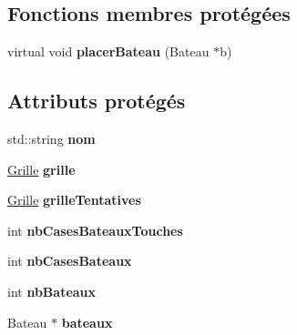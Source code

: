 \subsection*{Fonctions membres protégées}
\begin{DoxyCompactItemize}
\item 
virtual void {\bfseries placer\+Bateau} (Bateau $\ast$b)\hypertarget{class_joueur_a82aa78e161543bbbc01f759d71e0bbc7}{}\label{class_joueur_a82aa78e161543bbbc01f759d71e0bbc7}

\end{DoxyCompactItemize}
\subsection*{Attributs protégés}
\begin{DoxyCompactItemize}
\item 
std\+::string {\bfseries nom}\hypertarget{class_joueur_abaee0b4f259181bf66dbab54bef971bb}{}\label{class_joueur_abaee0b4f259181bf66dbab54bef971bb}

\item 
\hyperlink{class_grille}{Grille} {\bfseries grille}\hypertarget{class_joueur_a97a052f0b9966c94c49862df3144a62f}{}\label{class_joueur_a97a052f0b9966c94c49862df3144a62f}

\item 
\hyperlink{class_grille}{Grille} {\bfseries grille\+Tentatives}\hypertarget{class_joueur_abbef5ee9c9c05a24ffa2c462e14cdfd7}{}\label{class_joueur_abbef5ee9c9c05a24ffa2c462e14cdfd7}

\item 
int {\bfseries nb\+Cases\+Bateaux\+Touches}\hypertarget{class_joueur_a3a41069191547937ddd3acd15eecd4ee}{}\label{class_joueur_a3a41069191547937ddd3acd15eecd4ee}

\item 
int {\bfseries nb\+Cases\+Bateaux}\hypertarget{class_joueur_a29e4485fe7b0a3f2c962757b7c7bf2a5}{}\label{class_joueur_a29e4485fe7b0a3f2c962757b7c7bf2a5}

\item 
int {\bfseries nb\+Bateaux}\hypertarget{class_joueur_a56752b0a96da94b17b07fd0312035a13}{}\label{class_joueur_a56752b0a96da94b17b07fd0312035a13}

\item 
Bateau $\ast$ {\bfseries bateaux}\hypertarget{class_joueur_acf537ce482b493555318da7da14d8ac9}{}\label{class_joueur_acf537ce482b493555318da7da14d8ac9}

\end{DoxyCompactItemize}
